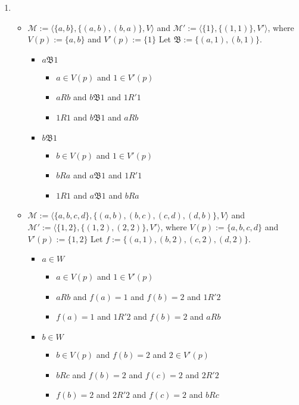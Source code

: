 \documentclass[11pt,a4paper]{article}
\newtheorem{lemma}[theorem]{Lemma}
\begin{document}
\begin{enumerate}
\begin{lemma}
If $f: W \to W'$ is a bounded morphism then for all $s \in W$, $s\mathfrak{B}f(s)$ is a bisimulation.
\end{lemma}
\item 
\begin{itemize}
\item $\mathcal{M}:= \langle \{a,b\}, \{(a,b),(b,a)\},V\rangle$ and $\mathcal{M}':= \langle \{1\}, \{(1,1)\},V'\rangle$, where $V(p):=\{a,b\}$ and $V'(p):=\{1\}$ Let $\mathfrak{B}:=\{(a,1),(b,1)\}$.
\begin{itemize}
\item $a\mathfrak{B}1$
\begin{itemize}
\item $a \in V(p)$ and $1  \in V'(p)$
\item $aRb$ and $b\mathfrak{B}1$ and $1R'1$
\item $1R1$ and $b\mathfrak{B}1$ and $aRb$
\end{itemize}
\item $b\mathfrak{B}1$
\begin{itemize}
\item $b \in V(p)$ and $1  \in V'(p)$
\item $bRa$ and $a\mathfrak{B}1$ and $1R'1$
\item $1R1$ and $a\mathfrak{B}1$ and $bRa$
\end{itemize}
\end{itemize}


\item $\mathcal{M}:= \langle \{a,b,c,d\}, \{(a,b),(b,c),(c,d),(d,b)\},V\rangle$ and $\mathcal{M}':= \langle \{1,2\}, \{(1,2),(2,2)\},V'\rangle$, where $V(p):=\{a,b,c,d\}$ and $V'(p):=\{1,2\}$ Let $f:=\{(a,1),(b,2),(c,2),(d,2)\}$. 
\begin{itemize}
\item $a \in W$
\begin{itemize}
\item $a \in V(p)$ and $1  \in V'(p)$
\item $aRb$ and $f(a)=1$ and $f(b)=2$ and $1R'2$
\item $f(a)=1$ and $1R'2$ and $f(b)=2$ and $aRb$
\end{itemize}

\item $b \in W$
\begin{itemize}
\item $b \in V(p)$ and $f(b)=2$ and $2  \in V'(p)$
\item $bRc$ and $f(b)=2$ and $f(c)=2$ and $2R'2$
\item $f(b)=2$ and $2R'2$ and $f(c)=2$ and $bRc$
\end{itemize}



\end{itemize}
\end{itemize}
\end{enumerate}
\end{document}
